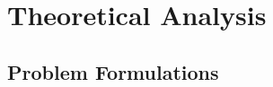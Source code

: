 \documentclass{article} %
\theoremstyle{definition}
\theoremstyle{plain}
\begin{document}
                
    

\section{Theoretical Analysis}

\subsection{Problem Formulations}
\end{document}
